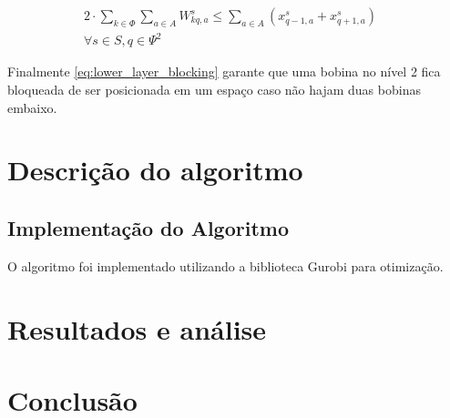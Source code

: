 \documentclass[journal]{IEEEtran}
\begin{document}
        \begin{align}
            2 \cdot \sum_{k \in \Phi} \sum_{a \in A} W^s_{kq,a} \leq \sum_{a \in A} (x^s_{q-1,a} + x^s_{q+1,a}) \quad \\
            \forall s \in S, q \in \Psi^2
            \label{eq:lower_layer_blocking}
        \end{align}

        Finalmente \ref{eq:lower_layer_blocking} garante que uma bobina no nível 2 fica 
        bloqueada de ser posicionada em um espaço caso não hajam duas bobinas 
        embaixo. 
    \section{Descrição do algoritmo}

    \subsection{Implementação do Algoritmo}
    O algoritmo foi implementado utilizando a biblioteca Gurobi para otimização.

        
    \section{Resultados e análise}


    
    \section{Conclusão}            
    
    
\end{document}

